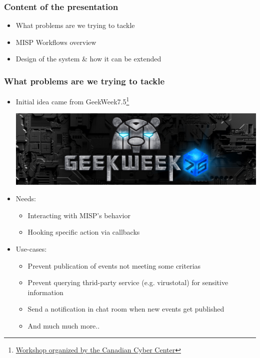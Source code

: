 
\begin{frame}[t,plain]
\titlepage
\end{frame}

\begin{frame}
    \frametitle{Content of the presentation}
    \begin{itemize}
        \item What problems are we trying to tackle
        \item MISP Workflows overview
        \item Design of the system \& how it can be extended
    \end{itemize}
\end{frame}

\begin{frame}
    \frametitle{What problems are we trying to tackle}
    \begin{itemize}
        \item Initial idea came from GeekWeek7.5\footnote{\href{https://cyber.gc.ca/en/events/geekweek-75}{Workshop organized by the Canadian Cyber Center}}
        \begin{center}
            \includegraphics[width=0.3\linewidth]{pictures/geekweek75.jpg}
        \end{center}
        \item Needs:
        \begin{itemize}
            \item Interacting with MISP's behavior
            \item Hooking specific action via callbacks
        \end{itemize}
        \item Use-cases:
        \begin{itemize}
            \item Prevent publication of events not meeting some criterias
            \item Prevent querying thrid-party service (e.g. virustotal) for sensitive information
            \item Send a notification in chat room when new events get published
            \item And much much more..
        \end{itemize}
    \end{itemize}
\end{frame}

